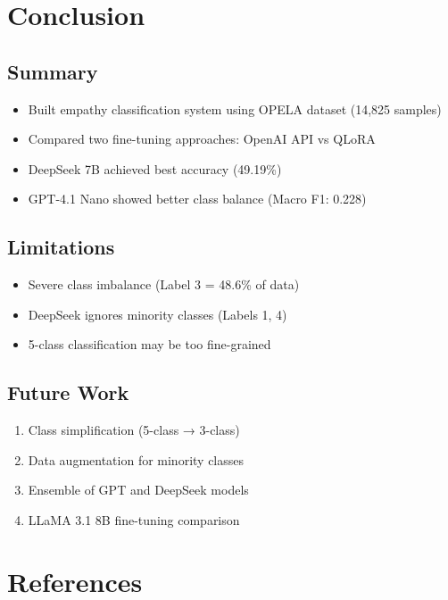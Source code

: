 \documentclass[11pt, a4paper]{article}
\begin{document}
\section{Conclusion}

\subsection{Summary}
\begin{itemize}
    \item Built empathy classification system using OPELA dataset (14,825 samples)
    \item Compared two fine-tuning approaches: OpenAI API vs QLoRA
    \item DeepSeek 7B achieved best accuracy (49.19\%)
    \item GPT-4.1 Nano showed better class balance (Macro F1: 0.228)
\end{itemize}

\subsection{Limitations}
\begin{itemize}
    \item Severe class imbalance (Label 3 = 48.6\% of data)
    \item DeepSeek ignores minority classes (Labels 1, 4)
    \item 5-class classification may be too fine-grained
\end{itemize}

\subsection{Future Work}
\begin{enumerate}
    \item Class simplification (5-class → 3-class)
    \item Data augmentation for minority classes
    \item Ensemble of GPT and DeepSeek models
    \item LLaMA 3.1 8B fine-tuning comparison
\end{enumerate}

\section{References}
\end{document}
